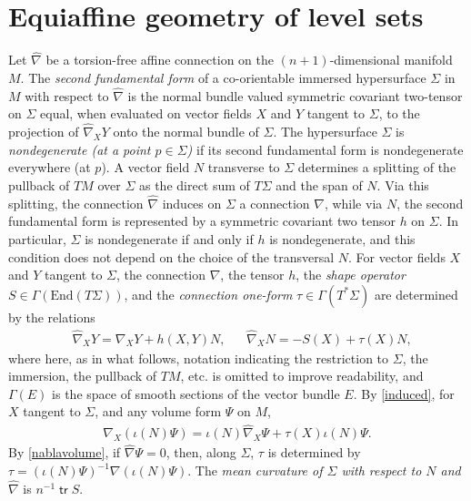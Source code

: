 \documentclass [leqno, 10pt]{amsart}
\theoremstyle{definition}
\numberwithin{equation}{section}
\newcommand{\imt}{\iota}
\newcommand{\Ga}{\Gamma}
\newcommand{\eno}{\text{End}}
\newcommand{\hnabla}{\widehat{\nabla}}
\newcommand{\tr}{\operatorname{\mathsf{tr}}}
\begin{document}
\section{Equiaffine geometry of level sets}\label{prelimsection}
Let $\hnabla$ be a torsion-free affine connection on the $(n+1)$-dimensional manifold $M$. The \textit{second fundamental form} of a co-orientable immersed hypersurface $\Sigma$ in $M$ with respect to $\hnabla$ is the normal bundle valued symmetric covariant two-tensor on $\Sigma$ equal, when evaluated on vector fields $X$ and $Y$ tangent to $\Sigma$, to the projection of $\hnabla_{X}Y$ onto the normal bundle of $\Sigma$.
The hypersurface $\Sigma$ is \textit{nondegenerate (at a point $p \in \Sigma$)} if its second fundamental form is nondegenerate everywhere (at $p$). A vector field $N$ transverse to $\Sigma$ determines a splitting of the pullback of $TM$ over $\Sigma$ as the direct sum of $T\Sigma$ and the span of $N$. Via this splitting, the connection $\hnabla$ induces on $\Sigma$ a connection $\nabla$, while via $N$, the second fundamental form is represented by a symmetric covariant two tensor $h$ on $\Sigma$. In particular, $\Sigma$ is nondegenerate if and only if $h$ is nondegenerate, and this condition does not depend on the choice of the transversal $N$. For vector fields $X$ and $Y$ tangent to $\Sigma$, the connection $\nabla$, the tensor $h$, the \textit{shape operator} $S \in \Ga(\eno(T\Sigma))$, and the \textit{connection one-form} $\tau \in \Ga(T^{\ast}\Sigma)$ are determined by the relations
\begin{align}\label{induced}
&\hnabla_{X}Y = \nabla_{X}Y + h(X, Y)N,& &\hnabla_{X}N = -S(X) + \tau(X)N,
\end{align}
where here, as in what follows, notation indicating the restriction to $\Sigma$, the immersion, the pullback of $TM$, etc. is omitted to improve readability, and $\Ga(E)$ is the space of smooth sections of the vector bundle $E$. By \eqref{induced}, for $X$ tangent to $\Sigma$, and any volume form $\Psi$ on $M$,
\begin{align}\label{nablavolume}
\nabla_{X}(\imt(N)\Psi)  = \imt(N)\hnabla_{X}\Psi + \tau(X)\imt(N)\Psi.
\end{align}
By \eqref{nablavolume}, if $\hnabla \Psi = 0$, then, along $\Sigma$, $\tau$ is determined by $\tau = (\imt(N)\Psi)^{-1}\nabla(\imt(N)\Psi)$.
The \textit{mean curvature of $\Sigma$ with respect to $N$ and $\hnabla$} is $n^{-1}\tr S$.
\end{document}
